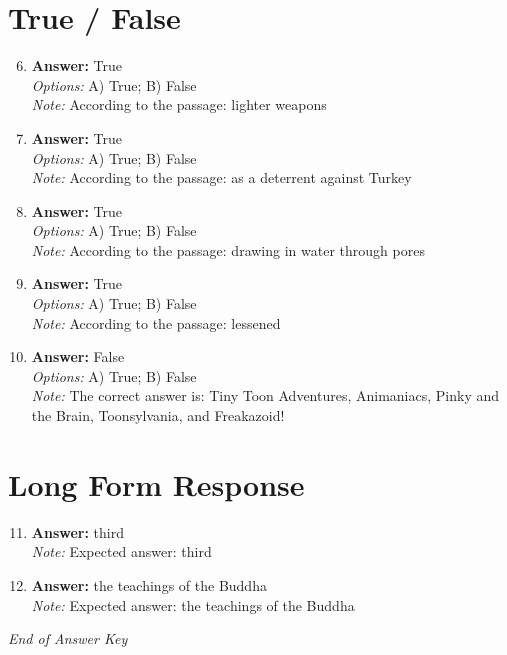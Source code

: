 \documentclass[12pt]{article}
\begin{document}
\section*{True / False}
\begin{enumerate}[label=\arabic*.]
\setcounter{enumi}{5}
\item \textbf{Answer:} True
\\ \textit{Options:} A) True; B) False
\\ \textit{Note:} According to the passage: lighter weapons
\item \textbf{Answer:} True
\\ \textit{Options:} A) True; B) False
\\ \textit{Note:} According to the passage: as a deterrent against Turkey
\item \textbf{Answer:} True
\\ \textit{Options:} A) True; B) False
\\ \textit{Note:} According to the passage: drawing in water through pores
\item \textbf{Answer:} True
\\ \textit{Options:} A) True; B) False
\\ \textit{Note:} According to the passage: lessened
\item \textbf{Answer:} False
\\ \textit{Options:} A) True; B) False
\\ \textit{Note:} The correct answer is: Tiny Toon Adventures, Animaniacs, Pinky and the Brain, Toonsylvania, and Freakazoid!
\end{enumerate}

\section*{Long Form Response}
\begin{enumerate}[label=\arabic*.]
\setcounter{enumi}{10}
\item \textbf{Answer:} third
\\ \textit{Note:} Expected answer: third
\item \textbf{Answer:} the teachings of the Buddha
\\ \textit{Note:} Expected answer: the teachings of the Buddha
\end{enumerate}

\vfill
\noindent\textit{End of Answer Key}
\end{document}
